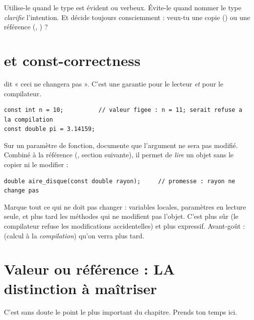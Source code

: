 \documentclass[11pt]{article}
\begin{document}
\begin{aretenir}
Utilise-le quand le type est évident ou verbeux. Évite-le quand nommer le type
\emph{clarifie} l'intention. Et décide toujours consciemment : veux-tu une copie
() ou une référence (, ) ?
\end{aretenir}

\section{ et const-correctness}

 dit « ceci ne changera pas ». C'est une garantie pour le lecteur
\emph{et} pour le compilateur.

\begin{lstlisting}
const int n = 10;          // valeur figee : n = 11; serait refuse a la compilation
const double pi = 3.14159;
\end{lstlisting}

Sur un paramètre de fonction,  documente que l'argument ne sera pas
modifié. Combiné à la référence (, section suivante), il permet
de \emph{lire} un objet sans le copier ni le modifier :

\begin{lstlisting}
double aire_disque(const double rayon);     // promesse : rayon ne change pas
\end{lstlisting}

\begin{aretenir}
Marque  tout ce qui ne doit pas changer : variables locales,
paramètres en lecture seule, et plus tard les méthodes qui ne modifient pas
l'objet. C'est plus sûr (le compilateur refuse les modifications accidentelles)
et plus expressif. Avant-goût :  (calcul à la \emph{compilation})
qu'on verra plus tard.
\end{aretenir}

\section{Valeur ou référence : LA distinction à maîtriser}

C'est sans doute le point le plus important du chapitre. Prends ton temps ici.
\end{document}
